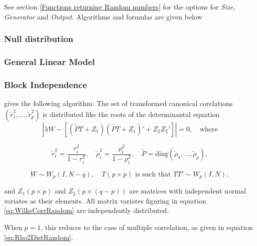\vspace{0.3cm}

See section \ref{Functions returning Random numbers} for the options for  {\itshape\sffamily Size},  {\itshape\sffamily Generator} and {\itshape\sffamily Output}. Algorithms and formulas are given below


\subsubsection{Null distribution}




\subsubsection{General Linear Model}





\subsubsection{Block Independence}


\cite{lee_distribution_1971} gives the following algorithm:
The set of transformed canonical corelations $(\tilde{r}_1^2,\ldots,\tilde{r}_p^2)$ is distributed like the roots of the determinantal equation
\begin{equation}
	\left|\lambda W - \left[(\tilde{P}T+Z_1)(\tilde{P}T+Z_1)' + Z_2 Z_2'\right]\right| = 0, \quad \text{where} \label{eq:WilksCorrRandom}
\end{equation}

\begin{equation}
	\tilde{r}_i^2 = \frac{r_i^2}{1-r_i^2}, \quad \tilde{\rho}_i^2 = \frac{\rho_i^2}{1-\rho_i^2}, \quad \tilde{P} = \text{diag}(\tilde{\rho}_1,\ldots,\tilde{\rho}_p),
\end{equation}

\begin{equation}
	W \sim W_p(I,N-q), \quad T(p \times p) \text{ is such that } TT' \sim W_p(I,N),
\end{equation}

and $Z_1(p \times p)$ and $Z_2(p \times (q-p))$ are matrices with independent normal variates as their elements. All matrix variates figuring in equation \ref{eq:WilksCorrRandom} are independently distributed.

When $p=1$, this reduces to the case of multiple correlation, as given in equation \ref{eq:Rho2DistRandom}.







